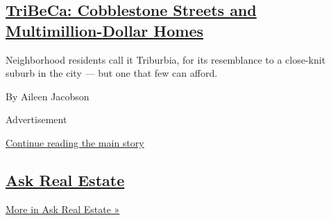 \begin{enumerate}
  \hypertarget{tribeca-cobblestone-streets-and-multimillion-dollar-homes}{%
  \subsection{\texorpdfstring{\href{/2020/09/02/realestate/living-in-tribeca.html}{TriBeCa:
  Cobblestone Streets and Multimillion-Dollar
  Homes}}{TriBeCa: Cobblestone Streets and Multimillion-Dollar Homes}}\label{tribeca-cobblestone-streets-and-multimillion-dollar-homes}}

  Neighborhood residents call it Triburbia, for its resemblance to a
  close-knit suburb in the city --- but one that few can afford.

  By Aileen Jacobson
\end{enumerate}

Advertisement

\protect\hyperlink{after-mid1}{Continue reading the main story}

\hypertarget{ask-real-estate}{%
\subsection{\texorpdfstring{\href{/column/ask-real-estate}{Ask Real
Estate}}{Ask Real Estate}}\label{ask-real-estate}}

\href{/column/ask-real-estate}{More in Ask Real Estate »}

